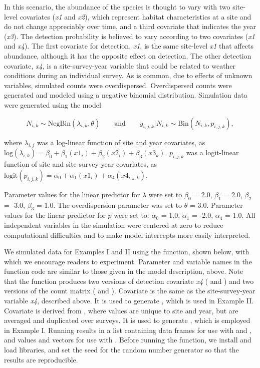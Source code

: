 \documentclass[codesnippet]{jss}
\begin{document}
In this scenario, the abundance of the species is thought to vary with two 
site-level covariates (\textit{x1} and \textit{x2}), which represent habitat 
characteristics at a site and do not change appreciably over time, and a 
third covariate that indicates the year (\textit{x3}). The detection 
probability is believed to vary according to two covariates (\textit{x1} and 
\textit{x4}). The first covariate for detection, \textit{x1}, is the same 
site-level \textit{x1} that affects abundance, although it has the opposite 
effect on detection. The other detection covariate, \textit{x4}, is a 
site-survey-year variable that could be related to weather conditions during 
an individual survey. As is common, due to effects of unknown variables, 
simulated counts were overdispersed. Overdispersed counts were generated and 
modeled using a negative binomial distribution. Simulation data were 
generated using the model

\begin{equation} \label{eq2}
N_{i,k} \sim \text{NegBin}(\lambda_{i,k}, \theta) \qquad \text{and} \qquad  
y_{i,j,k} | N_{i,k} \sim \text{Bin}(N_{i,k}, p_{i,j,k}),
\end{equation}

where $\lambda_{i,j}$ was a log-linear function of site and year covariates, 
as $\text{log}(\lambda_{i,k}) = \beta_0 + \beta_1 (\textit{x1}_{i}) + 
\beta_2 (\textit{x2}_{i}) + \beta_3 (\textit{x3}_{k})$. $p_{i,j,k}$ was a 
logit-linear function of site and site-survey-year covariates, as 
$\text{logit}(p_{i,j,k}) = \alpha_0 + \alpha_1 (\textit{x1}_{i}) + \alpha_4 
(\textit{x4}_{i,j,k})$.

Parameter values for the linear predictor for $\lambda$ were set to $\beta_0$ = 2.0, $\beta_1$ = 2.0, $\beta_2$ = -3.0, $\beta_3$ = 1.0. The overdispersion parameter was set to $\theta$ = 3.0. Parameter values for the linear predictor for $p$ were set to: $\alpha_0$ = 1.0, $\alpha_1$ = -2.0, $\alpha_4$ = 1.0. All independent variables in the simulation were centered at zero to reduce computational difficulties and to make model intercepts more easily interpreted.

We simulated data for Examples I and II using the  
function, shown below, with which we encourage readers to experiment. 
Parameter and variable names in the function code are similar to those given 
in the model description, above. Note that the function produces two 
versions of detection covariate \textit{x4} ( and ) and 
two versions of the count matrix ( and ). Covariate 
 is the same as the site-survey-year variable \textit{x4}, 
described above. It is used to generate , which is used in Example 
II. Covariate  is derived from , where values are unique 
to site and year, but are averaged and duplicated over surveys. It is used 
to generate , which is employed in Example I. Running 
 results in a list containing data frames for use with 
 and , and values and vectors for use with 
. Before running the function, we install and load libraries, 
and set the seed for the random number generator so that the results are 
reproducible.
\end{document}
